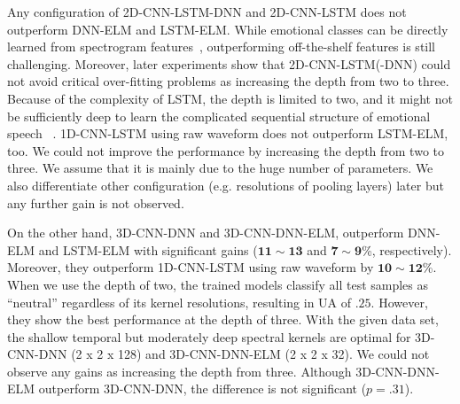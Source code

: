 \documentclass[conference, compsoc, twoside]{IEEEtran}
\begin{document}
Any configuration of 2D-CNN-LSTM-DNN and 2D-CNN-LSTM does not outperform DNN-ELM and LSTM-ELM. While emotional classes can be directly learned from spectrogram features~\cite{ghoshrepresentation2016}, outperforming off-the-shelf features is still challenging. Moreover, later experiments show that 2D-CNN-LSTM(-DNN) could not avoid critical over-fitting problems as increasing the depth from two to three. Because of the complexity of LSTM, the depth is limited to two, and it might not be sufficiently deep to learn the complicated sequential structure of emotional speech ~\cite{kim2013emotion}. 1D-CNN-LSTM using raw waveform does not outperform LSTM-ELM, too. We could not improve the performance by increasing the depth from two to three. We assume that it is mainly due to the huge number of parameters. We also differentiate other configuration (e.g. resolutions of pooling layers) later but any further gain is not observed. 

On the other hand, 3D-CNN-DNN and 3D-CNN-DNN-ELM, outperform DNN-ELM and LSTM-ELM with significant gains ($\mathbf{11 \sim 13}$ and $\mathbf{7 \sim 9}$\%, respectively). Moreover, they outperform 1D-CNN-LSTM using raw waveform by $\mathbf{10 \sim 12}$\%. When we use the depth of two, the trained models classify all test samples as ``neutral'' regardless of its kernel resolutions, resulting in UA of $.25$. However, they show the best performance at the depth of three. With the given data set, the shallow temporal but moderately deep spectral kernels are optimal for 3D-CNN-DNN (2 x 2 x 128) and 3D-CNN-DNN-ELM (2 x 2 x 32). We could not observe any gains as increasing the depth from three. Although 3D-CNN-DNN-ELM outperform 3D-CNN-DNN, the difference is not significant ($p = .31$). 
\end{document}
